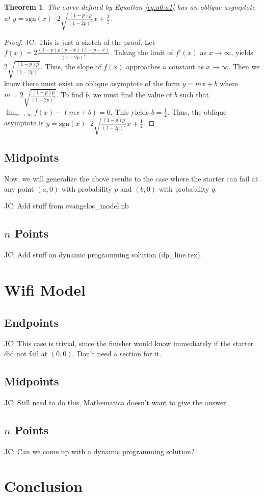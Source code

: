\documentclass{article}
\newcommand\JC[1]{{\color{Maroon} JC: #1}}         %
\newtheorem{theorem}{Theorem}[section]
\begin{document}
\begin{theorem}
    The curve defined by Equation \ref{eq:a0:a1} has an oblique asymptote at $y = \text{sgn}(x) \cdot 2 \sqrt{\frac{(1-p)p}{(1-2p)^2}}x + \frac{1}{2}$.
\end{theorem}
\begin{proof}
    \JC{This is just a sketch of the proof.}
    Let $f(x) = 2 \frac{(1-p)p(p-x)(1-p-x)}{(1-2p)^2}$.
    Taking the limit of $f'(x)$ as $x \to \infty$, yields $2 \sqrt{\frac{(1-p)p}{(1-2p)^2}}$.
    Thus, the slope of $f(x)$ approaches a constant as $x \to \infty$.
    Then we know there must exist an oblique asymptote of the form $y = mx + b$ where $m = 2 \sqrt{\frac{(1-p)p}{(1-2p)^2}}$.
    To find $b$, we must find the value of $b$ such that $\lim_{x \to \infty} f(x) - (m x + b) = 0$.
    This yields $b = \frac{1}{2}$. Thus, the oblique asymptote is $y = \text{sgn}(x) \cdot 2 \sqrt{\frac{(1-p)p}{(1-2p)^2}}x + \frac{1}{2}$.
\end{proof}


\subsection{Midpoints}
Now, we will generalize the above results to the case where the starter can fail at any point $(a, 0)$ with probability $p$ and $(b, 0)$ with probability $q$.

\JC{Add stuff from evangelos\_model.nb}


\subsection{$n$ Points}
\JC{Add stuff on dynamic programming solution (dp\_line.tex).}


\section{Wifi Model}

\subsection{Endpoints}
\JC{This case is trivial, since the finisher would know immediately if the starter did not fail at $(0,0)$. Don't need a section for it.}

\subsection{Midpoints}
\JC{Still need to do this, Mathematica doesn't want to give the answer}

\subsection{$n$ Points}
\JC{Can we come up with a dynamic programming solution?}


\section{Conclusion}


\printbibliography
\end{document}
